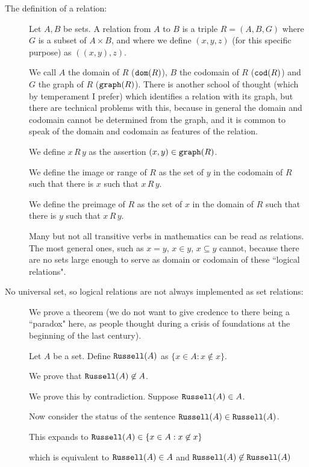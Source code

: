 \documentclass[12pt]{article}
\begin{document}
\begin{description}

\item[The definition of a relation:]

Let $A,B$ be sets.  A relation from $A$ to $B$ is a triple $R=(A,B,G)$ where $G$ is a subset of $A \times B$, and where we define $(x,y,z)$ (for this specific purpose) as $((x,y),z)$.

We call $A$ the domain of $R$ (${\tt dom}(R)$), $B$ the codomain of $R$ (${\tt cod}(R)$) and $G$ the graph of $R$ (${\tt graph}(R)$).   There is another school of thought
(which by temperament I prefer) which identifies a relation with its graph, but there are technical problems with this, because in general the domain and codomain cannot be determined from the graph, and it is common to speak of the domain and codomain as features of the relation.

We define $x \,R\, y$ as the assertion $(x,y) \in {\tt graph}(R)$.

We define the image or range of $R$ as the set of $y$ in the codomain of $R$ such that there is $x$ such that $x \, R \, y$.

We define the preimage of $R$ as the set of $x$ in the domain of $R$ such that there is $y$ such that $x \, R \, y$.

Many but not all transitive verbs in mathematics can be read as relations.  The most general ones, such
as $x = y$, $x \in y$, $x \subseteq y$ cannot, because there are no sets large enough to serve as domain or codomain of these ``logical relations".

\item[No universal set, so logical relations are not always implemented as set relations:]

We prove a theorem (we do not want to give credence to there being a ``paradox" here, as people thought during a crisis of foundations at the beginning of the last century).

Let $A$ be a set.  Define ${\tt Russell}(A)$ as $\{x \in A:x \not\in x\}$.

We prove that ${\tt Russell}(A)\not\in A$.

We prove this by contradiction.  Suppose ${\tt Russell}(A)\in A$.  

Now consider the status of the sentence ${\tt Russell}(A) \in {\tt Russell}(A)$.

This expands to ${\tt Russell}(A) \in \{x \in A:x \not\in x\}$

which is equivalent to ${\tt Russell}(A) \in A$ and ${\tt Russell}(A) \not\in {\tt Russell}(A)$


\end{description}
\end{document}
